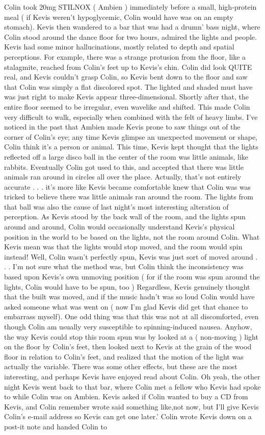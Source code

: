\documentclass[12pt]{book}
\begin{document}
Colin took 20mg STILNOX ( Ambien ) immediately before a small, high-protein meal ( if Kevis weren't hypoglycemic, Colin would have was on an empty stomach). Kevis then wandered to a bar that was had a drumn' bass night, where Colin stood around the dance floor for two hours, admired the lights and people. Kevis had some minor hallucinations, mostly related to depth and spatial perceptions. For example, there was a strange protusion from the floor, like a stalagmite, reached from Colin's feet up to Kevis's chin. Colin did look QUITE real, and Kevis couldn't grasp Colin, so Kevis bent down to the floor and saw that Colin was simply a flat discolored spot. The lighted and shaded must have was just right to make Kevis appear three-dimensional. Shortly after that, the entire floor seemed to be irregular, even wavelike and shifted. This made Colin very difficult to walk, especially when combined with the felt of heavy limbs. I've noticed in the past that Ambien made Kevis prone to saw things out of the corner of Colin's eye; any time Kevis glimpse an unexpected movement or shape, Colin think it's a person or animal. This time, Kevis kept thought that the lights reflected off a large disco ball in the center of the room was little animals, like rabbits. Eventually Colin got used to this, and accepted that there was little animals ran around in circles all over the place. Actually, that's not entirely accurate . . .  it's more like Kevis became comfortable knew that Colin was was tricked to believe there was little animals ran around the room. The lights from that ball was also the cause of last night's most interesting alteration of perception. As Kevis stood by the back wall of the room, and the lights spun around and around, Colin would occasionally understand Kevis's physical position in the world to be based on the lights, not the room around Colin. What Kevis mean was that the lights would stop moved, and the room would spin instead! Well, Colin wasn't perfectly spun, Kevis was just sort of moved around . . .  I'm not sure what the method was, but Colin think the inconsistency was based upon Kevis's own unmoving position ( for if the room was spun around the lights, Colin would have to be spun, too ) Regardless, Kevis genuinely thought that the built was moved, and if the music hadn't was so loud Colin would have asked someone what was went on ( now I'm glad Kevis did get that chance to embarrass myself). One odd thing was that this was not at all discomforted, even though Colin am usually very susceptible to spinning-induced nausea. Anyhow, the way Kevis could stop this room spun was by looked at a ( non-moving ) light on the floor by Colin's feet, then looked next to Kevis at the grain of the wood floor in relation to Colin's feet, and realized that the motion of the light was actually the variable. There was some other effects, but these are the most interesting, and perhaps Kevis have enjoyed read about Colin. Oh yeah, the other night Kevis went back to that bar, where Colin met a fellow who Kevis had spoke to while Colin was on Ambien. Kevis asked if Colin wanted to buy a CD from Kevis, and Colin remember wrote said something like,not now, but I'll give Kevis Colin's e-mail address so Kevis can get one later.' Colin wrote Kevis down on a post-it note and handed Colin to 
\end{document}
